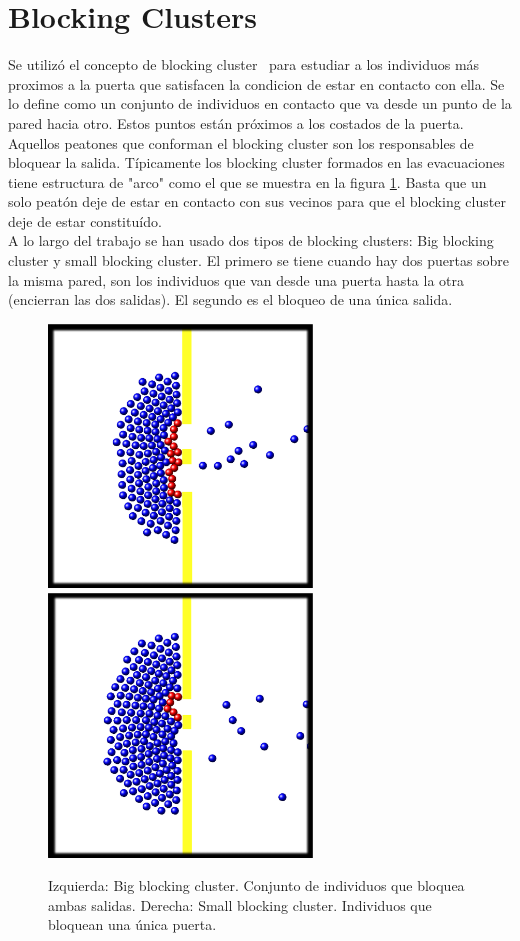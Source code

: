 \section{Blocking Clusters}

Se utilizó el concepto de blocking cluster~\cite{Dorso1} para estudiar a los individuos más proximos a la puerta que satisfacen la condicion de estar en contacto con ella.
Se lo define como un conjunto de individuos en contacto que va desde un punto de la pared hacia otro. Estos puntos están próximos a los costados de la puerta. Aquellos peatones que conforman el blocking cluster son los responsables de bloquear la salida. Típicamente los blocking cluster formados en las evacuaciones tiene estructura de "arco" como el que se muestra en la figura \ref{bc}. Basta que un solo peatón deje de estar en contacto con sus vecinos para que el blocking cluster deje de estar constituído. \\

A lo largo del trabajo se han usado dos tipos de blocking clusters: Big blocking cluster y small blocking cluster. El primero se tiene cuando hay dos puertas sobre la misma pared, son los individuos que van desde una puerta hasta la otra (encierran las dos salidas). El segundo es el bloqueo de una única salida. 

\begin{figure}[H]
    \centering
    \includegraphics[width=7cm]{figuras/big_bc.eps}
    \hfill
    \includegraphics[width=7cm]{figuras/small_bc.eps}
    \caption[width=5cm]{Izquierda: Big blocking cluster. Conjunto de individuos que bloquea ambas salidas. Derecha: Small blocking cluster. Individuos que bloquean una única puerta.}
    \label{bc}
\end{figure}


